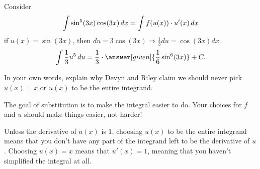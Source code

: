\documentclass{ximera}
\begin{document}
\begin{problem}
  Consider
  \[
  \int \sin^5(3x) \cos(3x) \mathop{}\!d x = \int f(u(x)) \cdot u'(x) \mathop{}\!d x
  \]
  if $u(x) = \sin(3x)$, then $du=3\cos(3x)\Rightarrow \frac{1}{3}du=\cos(3x)dx$
  \[
  \int \frac{1}{3} u^5 \d u=\frac{1}{3}\cdot\answer[given]{\frac{1}{6}\sin^6(3x)}+C.
  \]


\end{problem}

\begin{problem}
	In your own words, explain why Devyn and Riley claim we should never 
	pick $u(x) = x$ or $u(x)$ to be the entire integrand.
	\begin{freeResponse}
		The goal of substitution is to make the integral easier to do.  Your choices
		for $f$ and $u$ should make things easier, not harder!
	
		Unless the derivative of $u(x)$ is $1$, choosing $u(x)$ to be the entire
		integrand means that you don't have any part of the integrand left to be
		the derivative of $u$.  Choosing $u(x) = x$ means that $u'(x) = 1$, meaning
		that you haven't simplified the integral at all.  
	\end{freeResponse}
\end{problem}


\end{document}
